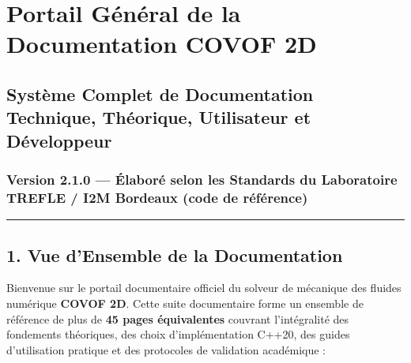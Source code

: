 \documentclass[
  french,
]{article}
\author{}
\date{}
\begin{document}
\section{Portail Général de la Documentation COVOF
2D}\label{portail-guxe9nuxe9ral-de-la-documentation-covof-2d}

\subsection{Système Complet de Documentation Technique, Théorique,
Utilisateur et
Développeur}\label{systuxe8me-complet-de-documentation-technique-thuxe9orique-utilisateur-et-duxe9veloppeur}

\subsubsection{Version 2.1.0 --- Élaboré selon les Standards du
Laboratoire TREFLE / I2M Bordeaux (code de
référence)}\label{version-2.1.0-uxe9laboruxe9-selon-les-standards-du-laboratoire-trefle-i2m-bordeaux-code-de-ruxe9fuxe9rence}

\begin{center}\rule{0.5\linewidth}{0.5pt}\end{center}

\subsection{1. Vue d'Ensemble de la
Documentation}\label{vue-densemble-de-la-documentation}

Bienvenue sur le portail documentaire officiel du solveur de mécanique
des fluides numérique \textbf{COVOF 2D}. Cette suite documentaire forme
un ensemble de référence de plus de \textbf{45 pages équivalentes}
couvrant l'intégralité des fondements théoriques, des choix
d'implémentation C++20, des guides d'utilisation pratique et des
protocoles de validation académique :
\end{document}
